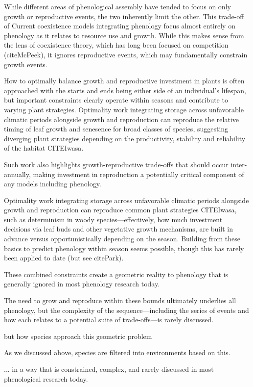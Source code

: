 \documentclass[11pt]{article}
\begin{document}
While different areas of phenological assembly have tended to focus on only growth or reproductive events, the two inherently limit the other. This trade-off of 
Current coexistence models integrating phenology focus almost entirely on phenology as it relates to resource use and growth. While this makes sense from the lens of coexistence theory, which has long been focused on competition (citeMcPeek), it ignores reproductive events, which may fundamentally constrain growth events. 

How to optimally balance growth and reproductive investment in plants is often approached with the starts and ends being either side of an individual's lifespan, but important constraints clearly operate within seasons and contribute to varying plant strategies. Optimality work integrating storage across unfavorable climatic periods alongside growth and reproduction can reproduce the relative timing of leaf growth and senesence for broad classes of species, suggesting diverging plant strategies depending on the productivity, stability and reliability of the habitat CITEIwasa. 

Such work also highlights growth-reproductive trade-offs that should occur inter-annually, making investment in reproduction a potentially critical component of any models including phenology. 

Optimality work integrating storage across unfavorable climatic periods alongside growth and reproduction can reproduce common plant strategies CITEIwasa, such as determinism in woody species---effectively, how much investment decisions via leaf buds and other vegetative growth mechanisms, are built in advance versus opportunistically depending on the season. Building from these basics to predict phenology within season seems possible, though this has rarely been applied to date (but see citePark). 

These combined constraints create a geometric reality to phenology that is generally ignored in most phenology research today. 

The need to grow and reproduce within these bounds ultimately underlies all phenology, but the complexity of the sequence---including the series of events and how each relates to a potential suite of trade-offs---is rarely discussed. 

but how species approach this geometric problem 

As we discussed above, species are filtered into environments based on this.

... in a way that is constrained, complex, and rarely discussed in most phenological research today.  
\end{document}
